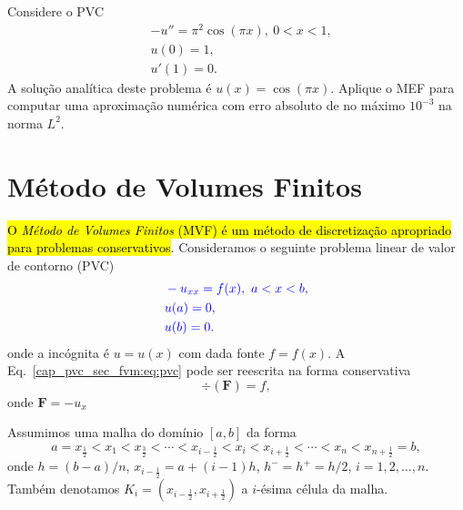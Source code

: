 \begin{exer}
  Considere o PVC
  \begin{align}
    &-u'' = \pi^2\cos(\pi x), ~0 < x < 1,\\
    &u(0) = 1,\\
    &u'(1) = 0.
  \end{align}
  A solução analítica deste problema é $u(x) = \cos(\pi x)$. Aplique o MEF para computar uma aproximação numérica com erro absoluto de no máximo $10^{-3}$ na norma $L^2$.
\end{exer}

\section{Método de Volumes Finitos}

\hl{O \emph{Método de Volumes Finitos} (MVF) é um método de discretização apropriado para problemas conservativos}. Consideramos o seguinte problema linear de valor de contorno (PVC)
\begin{subequations}\label{cap_pvc_sec_fvm:eq:pvc}\hleq
  \begin{align}
    &-u_{xx} = f(x), ~a < x < b, \label{cap_pvc_sec_fem:eq:pvc_eq}\\
    &u(a) = 0, \label{cap_pvc_sec_fem:eq:pvc_bc1}\\
    &u(b) = 0. \label{cap_pvc_sec_fem:eq:pvc_bc2}
  \end{align}
\end{subequations}
onde a incógnita é $u = u(x)$ com dada fonte $f = f(x)$. A Eq.~\eqref{cap_pvc_sec_fvm:eq:pvc} pode ser reescrita na forma conservativa
\begin{equation}
  \div(\pmb{F}) = f,
\end{equation}
onde $\pmb{F} = -u_x$

\begin{flushleft}
\end{flushleft}

Assumimos uma malha do domínio $[a, b]$ da forma
\begin{equation}
  a = x_{\frac{1}{2}} < x_1 < x_{\frac{3}{2}} < \cdots < x_{i-\frac{1}{2}} < x_i < x_{i+\frac{1}{2}} < \cdots < x_{n} < x_{n+\frac{1}{2}} = b,
\end{equation}
onde $h = (b-a)/n$, $x_{i-\frac{1}{2}} = a + (i-1)h$, $h^{-} = h^{+} = h/2$, $i = 1, 2, \dotsc, n$. Também denotamos $K_i = \left(x_{i-\frac{1}{2}}, x_{i+\frac{1}{2}}\right)$ a $i$-ésima célula da malha.

